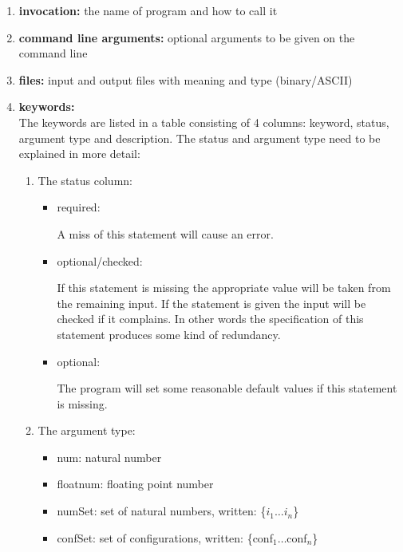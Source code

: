 \begin{enumerate}

\item {\bf invocation:} the name of program and how to call it

\item {\bf command line arguments:}
optional arguments to be given on the command line

\item {\bf files:}
input and output files with meaning and type (binary/ASCII)

\item {\bf keywords:}\\
The keywords are listed in a table consisting of 4 columns:
keyword, status, argument type and description. The status and argument type
need to be explained in more detail:


\begin{enumerate}
\item The status column:
\begin{itemize}
\item required: 

A miss of this statement will cause an error.


\item optional/checked: 

If this statement is missing the appropriate
value will be taken from the remaining input.
If the statement is given the input will
be checked if it complains. In other words the specification of this
statement produces some kind of redundancy.


\item optional: 

The program will set some
reasonable default values if this statement is missing.
\end{itemize}



\item The argument type:
\begin{itemize}
\item num: natural number

\item floatnum: floating point number

\item numSet: set of natural numbers, written: \{$i_1 \ldots i_n$\}

\item confSet: set of configurations, written: \{conf$_1 \ldots $conf$_n$\}


\end{itemize}
\end{enumerate}
\end{enumerate}
